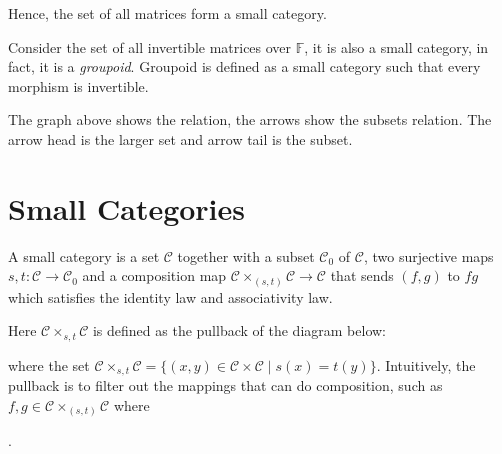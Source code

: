 \documentclass[
	11pt, %
	fleqn, %
	a4paper, %
]{LegrandOrangeBook}
\newcommand{\F}{\mathbb{F}} %
\newcommand{\C}{\mathcal{C}} %
\begin{document}
Hence, the set of all matrices form a small category.

Consider the set of all invertible matrices over $\F$, it is also a small category, in fact, it is a \emph{groupoid}. Groupoid is defined as a small category such that every morphism is invertible.

\begin{center}
\end{center}
The graph above shows the relation, the arrows show the subsets relation. The arrow head is the larger set and arrow tail is the subset.

\section{Small Categories}

\begin{definition}
    A small category is a set $\C$ together with a subset $\C_0$ of $\C$, two surjective maps $s, t : \C \to \C_0$ and a composition map $\C \times_{(s, t)} \C \to \C$ that sends $(f, g)$ to $fg$ which satisfies the identity law and associativity law.
\end{definition}

Here $\C \times_{s, t} \C$ is defined as the pullback of the diagram below:
\begin{center}
\end{center}
where the set $\C \times_{s, t} \C = \{ (x, y) \in \C \times \C \mid s(x) = t(y) \}$. Intuitively, the pullback is to filter out the mappings that can do composition, such as $f, g \in \C \times_{(s, t)} \C$ where .
\end{document}
